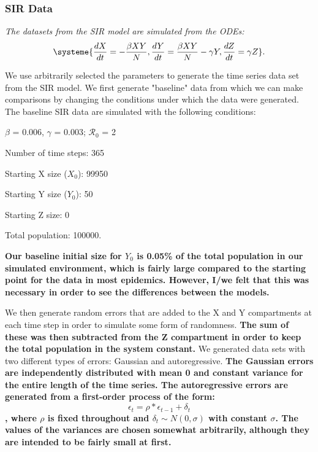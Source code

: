 \documentclass[12pt]{article}
\newcommand{\rr}{\ensuremath{\mathcal{R}_0}}
\begin{document}



\subsubsection{SIR Data}

\textit{The datasets from the SIR model are simulated from the ODEs: \begin{align}
	\systeme{\frac{dX}{dt} = -\frac{\beta XY}{N}, \frac{dY}{dt} = \frac{\beta XY}{N} - \gamma Y, \frac{dZ}{dt} = \gamma Z}.
	\end{align}
} 

We use arbitrarily selected the parameters to generate the time series data set from the SIR model. We first generate "baseline" data from which we can make comparisons by changing the  conditions under which the data were generated. The baseline SIR data are simulated with the following conditions:

\begin{center}
	
	$\beta$ = 0.006, $\gamma$ = 0.003; $\rr$ = 2
	
	Number of time steps: 365
	
	Starting X size ($X_0$): 99950
	
	Starting Y size ($Y_0$): 50
	
	Starting Z size: 0
	
	Total population: 100000.
	
\end{center}


\textbf{Our baseline initial size for $Y_0$ is 0.05\% of the total population in our simulated environment, which is fairly large compared to the starting point for the data in most epidemics. However, I/we felt that this was necessary in order to see the differences between the models.}

We then generate random errors that are added to the X and Y compartments at each time step in order to simulate some form of randomness. \textbf{The sum of these was then subtracted from the Z compartment in order to keep the total population in the system constant.} We generated data sets with two different types of errors: Gaussian and autoregressive. \textbf{The Gaussian errors are independently distributed with mean 0 and constant variance for the entire length of the time series. The autoregressive errors are generated from a first-order process of the form: $$ \epsilon_{t} = \rho * \epsilon_{t-1} + \delta_{t}$$, where $\rho$ is fixed throughout and $\delta_{t} \sim N(0, \sigma)$ with constant $\sigma$. The values of the variances are chosen somewhat arbitrarily, although they are intended to be fairly small at first.} 
\end{document}
